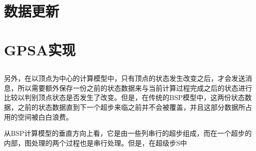 \section{数据更新}


\section{GPSA实现}
\subsection{}

另外，在以顶点为中心的计算模型中，只有顶点的状态发生改变之后，才会发送消息，所以需要额外保存一份之前的状态数据来与当前计算过程完成之后的状态进行比较以判别顶点状态是否发生了改变。但是，在传统的BSP模型中，这两份状态数据，之前的状态数据直到下一个超步来临之前并不会被覆盖，并且这部分数据所占用的空间被白白浪费。

从BSP计算模型的垂直方向上看，它是由一些列串行的超步组成，而在一个超步的内部，图处理的两个过程也是串行处理。但是，在超级步S中
